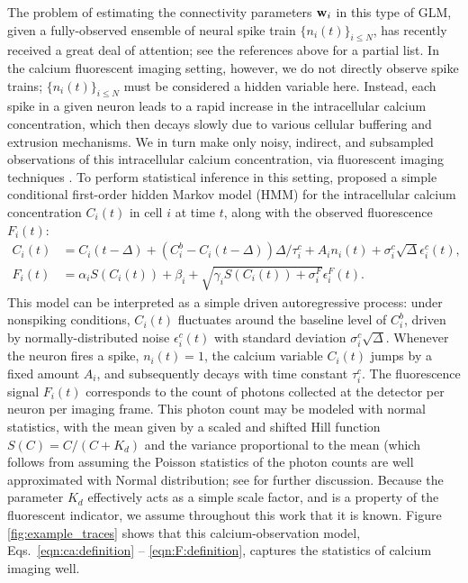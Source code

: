 The problem of estimating the connectivity parameters $\mathbf{w}_i$ in this type of GLM, given a fully-observed ensemble of neural spike train $\{n_i(t)\}_{i\leq N}$, has recently received a great deal of attention; see the references above for a partial list. In the calcium fluorescent imaging setting, however, we do not directly observe spike trains; $\{n_i(t)\}_{i\leq N}$ must be considered a hidden variable here. Instead, each spike in a given neuron leads to a rapid increase in the intracellular calcium concentration, which then decays slowly due to various cellular buffering and extrusion mechanisms. We in turn make only noisy, indirect, and subsampled observations of this intracellular calcium concentration, via fluorescent imaging techniques \cite{ImagingManual}. To perform statistical inference in this setting, \cite{Vogelstein2009} proposed a simple conditional first-order hidden Markov model (HMM) for the intracellular calcium concentration $C_i(t)$ in cell $i$ at time $t$, along with the observed fluorescence $F_i(t)$:
\begin{align}
\label{eqn:ca:definition}
C_i(t) &= C_i(t-\Delta) + (C_i^b-C_i(t-\Delta)) \Delta/\tau^c_i + A_i
n_i(t)+\sigma^c_i \sqrt{\Delta} \epsilon^c_i(t), \\ F_i(t) &= \alpha_i
S(C_i(t)) + \beta_i + \sqrt{\gamma_i S(C_i(t)) + \sigma^F_i}
\epsilon^F_i(t). \label{eqn:F:definition}
\end{align}
This model can be interpreted as a simple driven autoregressive process: under nonspiking conditions, $C_i(t)$ fluctuates around the baseline level of $C_i^b$, driven by normally-distributed noise $\epsilon^c_i(t)$ with standard deviation $\sigma^c_i \sqrt{\Delta}$. Whenever the neuron fires a spike, $n_i(t)=1$, the calcium variable $C_i(t)$ jumps by a fixed amount $A_i$, and subsequently decays with time constant $\tau^c_i$. The fluorescence signal $F_i(t)$ corresponds to the count of photons collected at the detector per neuron per imaging frame. This photon count may be modeled with normal statistics, with the mean given by a scaled and shifted Hill function $S(C)=C/(C+K_d)$ \cite{Yasuda2004} and the variance proportional to the mean (which follows from assuming the Poisson statistics of the photon counts are well approximated with Normal distribution; see \cite{Vogelstein2009} for further discussion. Because the parameter $K_d$ effectively acts as a simple scale factor, and is a property of the fluorescent indicator, we assume throughout this work that it is known. Figure \ref{fig:example_traces} shows that this calcium-observation model, Eqs.~\eqref{eqn:ca:definition} -- \eqref{eqn:F:definition}, captures the statistics of calcium imaging well.


